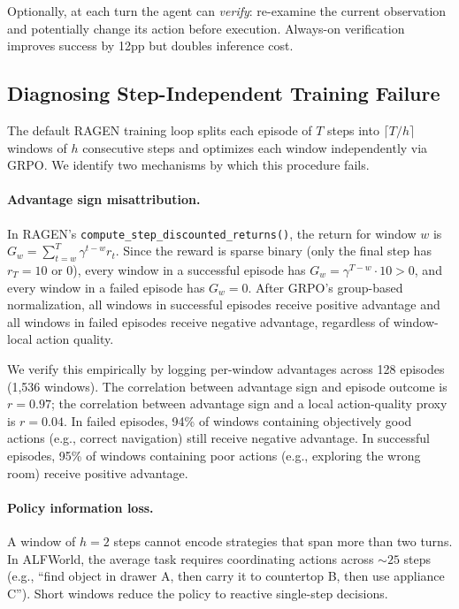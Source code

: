 \documentclass[10pt]{article}
\begin{document}
Optionally, at each turn the agent can \emph{verify}: re-examine the current observation and potentially change its action before execution. Always-on verification improves success by 12pp but doubles inference cost.

\subsection{Diagnosing Step-Independent Training Failure}
\label{sec:mechanism}

The default RAGEN training loop splits each episode of $T$ steps into $\lceil T/h \rceil$ windows of $h$ consecutive steps and optimizes each window independently via GRPO. We identify two mechanisms by which this procedure fails.

\paragraph{Advantage sign misattribution.}
In RAGEN's \texttt{compute\_step\_discounted\_returns()}, the return for window $w$ is $G_w = \sum_{t=w}^{T} \gamma^{t-w} r_t$. Since the reward is sparse binary (only the final step has $r_T = 10$ or $0$), every window in a successful episode has $G_w = \gamma^{T-w} \cdot 10 > 0$, and every window in a failed episode has $G_w = 0$. After GRPO's group-based normalization, all windows in successful episodes receive positive advantage and all windows in failed episodes receive negative advantage, regardless of window-local action quality.

We verify this empirically by logging per-window advantages across 128 episodes (1,536 windows). The correlation between advantage sign and episode outcome is $r = 0.97$; the correlation between advantage sign and a local action-quality proxy is $r = 0.04$. In failed episodes, 94\% of windows containing objectively good actions (e.g., correct navigation) still receive negative advantage. In successful episodes, 95\% of windows containing poor actions (e.g., exploring the wrong room) receive positive advantage.

\paragraph{Policy information loss.}
A window of $h = 2$ steps cannot encode strategies that span more than two turns. In ALFWorld, the average task requires coordinating actions across ${\sim}25$ steps (e.g., ``find object in drawer A, then carry it to countertop B, then use appliance C''). Short windows reduce the policy to reactive single-step decisions.
\end{document}
